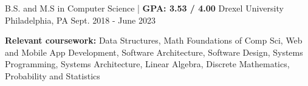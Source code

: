 

\begin{cventries}

  \cventry
  {B.S. and M.S in Computer Science | \textbf{ GPA: 3.53 / 4.00}} %
  {Drexel University} %
  {Philadelphia, PA} %
  {Sept. 2018 - June 2023} %
  {
    \begin{cvitems} %
      \item {\color{darktext} \textbf{Relevant coursework:}} Data Structures, Math Foundations of Comp Sci, Web and Mobile App Development,
      Software Architecture, Software Design, Systems Programming, Systems Architecture,
      Linear Algebra, Discrete Mathematics, Probability and Statistics
    \end{cvitems}
  }

\end{cventries}
